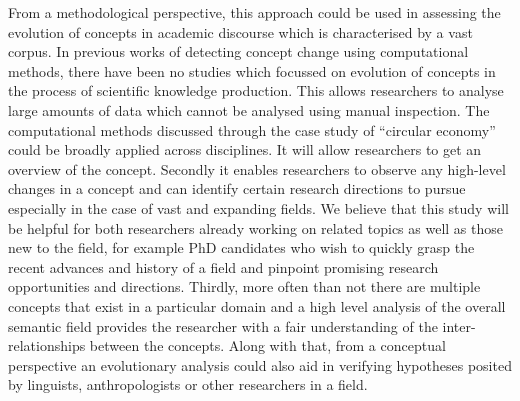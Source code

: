 \documentclass[output=paper]{langsci/langscibook}
\begin{document}
From a methodological perspective, this approach could be used in assessing the evolution of concepts in academic discourse which is characterised by a vast corpus. In previous works of detecting concept change using computational methods, there have been no studies which focussed on evolution of concepts in the process of scientific knowledge production. This allows researchers to analyse large amounts of data which cannot be analysed using manual inspection. The computational methods discussed through the case study of ``circular economy'' could be broadly applied across disciplines. It will allow researchers to get an overview of the concept. Secondly it enables researchers to observe any high-level changes in a concept and can identify  certain research directions to pursue especially in the case of vast and expanding fields. We believe that this study will be helpful for both researchers already working on related topics as well as those new to the field, for example PhD candidates who wish to quickly grasp the recent advances and history of a field and pinpoint promising research opportunities and directions. Thirdly, more often than not there are multiple concepts that exist in a particular domain and a high level analysis of the overall semantic field provides the researcher with a fair understanding of the inter-relationships between the concepts. Along with that, from a conceptual perspective an evolutionary analysis could also aid in verifying hypotheses posited by linguists, anthropologists or other researchers in a field.

\label{sec:05:appendix}
\end{document}
